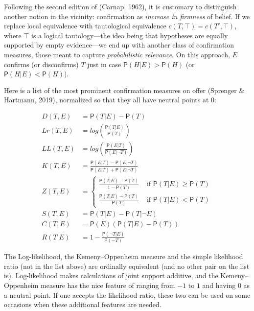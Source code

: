 \documentclass[
  letterpaper,
  DIV=11,
  numbers=noendperiod]{scrartcl}
\newcommand{\n}{\neg}
\newcommand{\pr}[1]{\mathsf{P}(#1)}
\begin{document}
Following the second edition of (Carnap, 1962), it is customary to
distinguish another notion in the vicinity: confirmation as
\textit{increase in firmness} of belief. If we replace local equivalence
with tautological equivalence \(c(T, \top) = c(T', \top)\), where
\(\top\) is a logical tautology---the idea being that hypotheses are
equally supported by empty evidence---we end up with another class of
confirmation measures, those meant to capture
\emph{probabilistic relevance}. On this approach, \(E\) confirms (or
disconfirms) \(T\) just in case \(\pr{H \vert E} > \pr{H}\) (or
\(\pr{H \vert E} < \pr{H}\)).

Here is a list of the most prominent confirmation measures on offer
(Sprenger \& Hartmann, 2019), normalized so that they all have neutral
points at 0:

\begin{align}
\tag{Difference}  D(T,E) & = \pr{T\vert E} - \pr{T}\\
\tag{Log-ratio}  Lr(T,E) &  = log\left(\frac{\pr{T\vert E}}{\pr{T}} \right) \\
\tag{Log-likelihood}   LL(T,E) & = log\left(\frac{\pr{E \vert T}}{\pr{E \vert \n T}} \right)\\
\tag{Kemeny-Oppenheim}  K(T,E) & = \frac{\pr{E\vert T} - \pr{E \vert \n T}}{\pr{E \vert T} + \pr{E \vert \n T}} \\
\tag{Generalized entailment}  Z(T,E) & = \begin{cases}
\frac{\pr{T\vert E} - \pr{T}}{1-\pr{T}} & \mbox{ if } \pr{T \vert E} \geq \pr{T}\\
\frac{\pr{T\vert E} - \pr{T}}{\pr{T}} & \mbox{ if } \pr{T \vert E} < \pr{T}
\end{cases} \\
\tag{Christensen-Joyce} S(T,E) & = \pr{T \vert E} - \pr{T \vert \n E} \\
\tag{Carnap}  C(T,E) & = \pr{E}(\pr{T\vert E} - \pr{T})\\
\tag{Rips} R(T\vert E) & = 1 - \frac{\pr{\n T\vert E}}{\pr{-T}}
\end{align}

\noindent The Log-likelihood, the Kemeny--Oppenheim measure and the
simple likelihood ratio (not in the list above) are ordinally equivalent
(and no other pair on the list is). Log-likelihood makes calculations of
joint support additive, and the Kemeny--Oppenheim measure has the nice
feature of ranging from \(-1\) to \(1\) and having 0 as a neutral point.
If one accepts the likelihood ratio, these two can be used on some
occasions when these additional features are needed.
\end{document}
